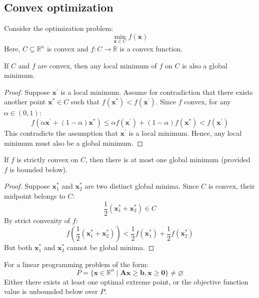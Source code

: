\subsection{Convex optimization}
Consider the optimization problem:
\[\min_{\mathbf{x}\in C} f(\mathbf{x})\] 
Here, $C \subseteq\mathbb{R}^n$ is convex and $f : C \rightarrow\mathbb{R}$ is a convex function.
\begin{proposition}
    If $C$ and $f$ are convex, then any local minimum of $f$ on $C$ is also a global minimum.
\end{proposition}
\begin{proof}
    Suppose $\mathbf{x}^\prime$ is a local minimum. 
    Assume for contradiction that there exists another point $\mathbf{x}^\ast\in C$ such that $f (\mathbf{x}^\ast) < f (\mathbf{x}^\prime)$.
    Since $f$ convex, for any $\alpha  \in (0, 1)$: 
    \[f (\alpha \mathbf{x}^\prime + (1 - \alpha )\mathbf{x}^\ast) \leq \alpha f (\mathbf{x}^\prime) + (1 - \alpha )f (\mathbf{x}^\ast) < f (\mathbf{x}^\prime)\]
    This contradicts the assumption that $\mathbf{x}^\prime$ is a local minimum.
    Hence, any local minimum must also be a global minimum.
\end{proof}
\begin{proposition}
    If $f$ is strictly convex on $C$, then there is at most one global minimum (provided $f$ is bounded below).
\end{proposition}
\begin{proof}
    Suppose $\mathbf{x}_1^\ast$ and $\mathbf{x}_2^\ast$ are two distinct global minima.
    Since $C$ is convex, their midpoint belongs to $C$: 
    \[\dfrac{1}{2}\left(\mathbf{x}_1^\ast+\mathbf{x}_2^\ast\right)\in C\]
    By strict convexity of $f$: 
    \[f\left(\dfrac{1}{2}\left(\mathbf{x}_1^\ast+\mathbf{x}_2^\ast\right)\right)<\dfrac{1}{2}f\left(\mathbf{x}_1^\ast\right)+\dfrac{1}{2}f\left(\mathbf{x}_2^\ast\right)\]
    But both $\mathbf{x}_1^\ast$ and $\mathbf{x}_2^\ast$ cannot be global minima.
\end{proof}
\begin{proposition}
    For a linear programming problem of the form:
    \[P = \{\mathbf{x}\in\mathbb{R}^n\mid\mathbf{Ax} \geq\mathbf{b}, \mathbf{x}\geq \mathbf{0} \} \neq\varnothing\] 
    Either there exists at least one optimal extreme point, or the objective function value is unbounded below over $P$.
\end{proposition}

